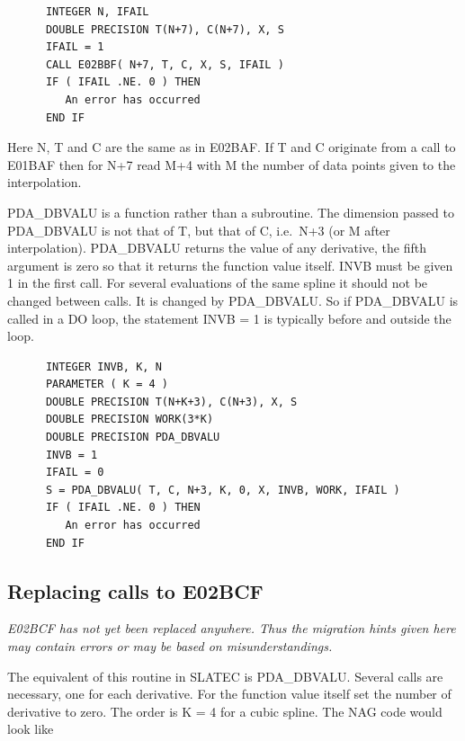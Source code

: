 \documentclass[11pt,twoside]{article}
\newcommand{\htmlref}[2]{#1}
\newcommand{\xlabel}[1]{}
\begin{document}
\begin{verbatim}
      INTEGER N, IFAIL
      DOUBLE PRECISION T(N+7), C(N+7), X, S
      IFAIL = 1
      CALL E02BBF( N+7, T, C, X, S, IFAIL )
      IF ( IFAIL .NE. 0 ) THEN
         An error has occurred
      END IF
\end{verbatim}

   Here N, T and C are the same as in
\htmlref{E02BAF.}{m_e02baf}
   If T and C originate from
   a call to
\htmlref{E01BAF}{m_e01baf}
   then for N+7 read M+4 with M the number of data
   points given to the interpolation.

   PDA\_DBVALU is a function rather than a subroutine. The dimension passed
   to PDA\_DBVALU is not that of T, but that of C, i.e.\ N+3 (or M after
   interpolation). PDA\_DBVALU returns the value of any derivative, the fifth
   argument is zero so that it returns the function value itself. INVB
   must be given 1 in the first call. For several evaluations of the
   same spline it should not be changed between calls. It is changed by
   PDA\_DBVALU. So if PDA\_DBVALU is called in a DO loop, the statement INVB = 1
   is typically before and outside the loop.

\begin{verbatim}
      INTEGER INVB, K, N
      PARAMETER ( K = 4 )
      DOUBLE PRECISION T(N+K+3), C(N+3), X, S
      DOUBLE PRECISION WORK(3*K)
      DOUBLE PRECISION PDA_DBVALU
      INVB = 1
      IFAIL = 0
      S = PDA_DBVALU( T, C, N+3, K, 0, X, INVB, WORK, IFAIL )
      IF ( IFAIL .NE. 0 ) THEN
         An error has occurred
      END IF
\end{verbatim}


\subsection{\xlabel{replacing_calls_to_e02bcf}Replacing calls to E02BCF}

{\em E02BCF has not yet been replaced anywhere. Thus the
   migration hints given here may contain errors or may be based on
   misunderstandings.\/}

   The equivalent of this routine in SLATEC is
\htmlref{PDA\_DBVALU.}{PDA\_DBVALU}
   Several calls are
   necessary, one for each derivative. For the function value itself set
   the number of derivative to zero. The order is K = 4 for a cubic
   spline. The NAG code would look like
\end{document}
